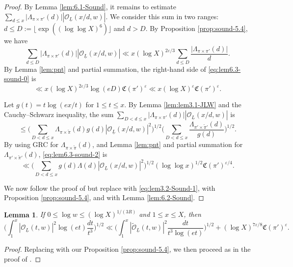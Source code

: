 \documentclass[12pt,reqno]{amsart}
\newtheorem{lem}[thm]{Lemma}
\theoremstyle{remark}
\numberwithin{equation}{section}
\begin{document}
	\begin{proof}
		By Lemma \ref{lem:6.1-Sound}, it remains to estimate $\sum_{d \le x}|\Lambda_{\pi \times \pi'}(d)||\mathcal{O}_{\underline{L}}(x/d,w)|$. We consider this sum in two ranges: $d \le D := \lfloor \exp((\log\log X)^6)\rfloor$ and $d > D$. By Proposition \ref{prop:sound-5.4}, we have
		\begin{equation}\label{eq:lem6.3-sound-0}
			\sum_{d \le D}|\Lambda_{\pi \times \pi'}(d)||\mathcal{O}_{\underline{L}}(x/d,w)| \ll x(\log X)^{2\varepsilon/3}\sum_{d \le D}\frac{|\Lambda_{\pi \times \pi'}(d)|}{d}.
		\end{equation}
		By Lemma \ref{lem:pnt} and partial summation, the right-hand side of \eqref{eq:lem6.3-sound-0} is	\begin{equation}\label{eq:lem6.3-sound-1}
                \ll x(\log X)^{2\varepsilon/3} \log(eD)\mathfrak{C}(\pi')^\varepsilon \ll x(\log X)^{\varepsilon} \mathfrak{C}(\pi')^\varepsilon .
	\end{equation}
 
     Let $g(t) = t \log(ex/t)$ for $1 \le t \le x$. By Lemma \ref{lem:lem3.1-JLW} and the Cauchy--Schwarz inequality, the sum $\sum_{D < d \le x}|\Lambda_{\pi \times \pi'}(d)||\mathcal{O}_{\underline{L}}(x/d,w)|$ is \begin{equation}
    \label{eq:lem6.3-sound-2}
        \le \Big(\sum_{D < d \le x}\Lambda_{\pi \times \widetilde{\pi}}(d)g(d)|\mathcal{O}_{\underline{L}}(x/d,w)|^2\Big)^{1/2} \Big(\sum_{D < d \le x}\frac{\Lambda_{\pi' \times \widetilde{\pi}'}(d)}{g(d)}\Big)^{1/2}.
     \end{equation}
        By using GRC for $\Lambda_{\pi \times \widetilde{\pi}}(d)$, and Lemma \ref{lem:pnt} and partial summation for $\Lambda_{\pi' \times \widetilde{\pi}'}(d)$,  \eqref{eq:lem6.3-sound-2} is 
	\begin{equation*}
            \ll  \Big(\sum_{D < d \le x}g(d)\Lambda(d)|\mathcal{O}_{\underline{L}}(x/d,w)|^2\Big)^{1/2}(\log\log x)^{1/2}\mathfrak{C}(\pi')^{{\varepsilon}/{4}}.
	\end{equation*}
 
		We now follow the proof of \cite[Proposition 6.3]{S} but replace \cite[Lemma 3.2]{S} with \eqref{eq:lem3.2-Sound-1}, \cite[Proposition 5.4]{S} with Proposition \ref{prop:sound-5.4}, and \cite[Lemma 6.2]{S} with Lemma \ref{lem:6.2-Sound}.
        \end{proof}

 
	\begin{lem}\label{lem:6.4-Sound}
		 If $0 \le \log w \le (\log X)^{1/(3R)}$ and $1 \le x \le X$, then 
		\begin{equation*}
			\Big(\int_1^x |\mathcal{O}_{\underline{L}}(t, w)|^2 \log(et) \frac{dt}{t^3}\Big)^{1/2} \ll \Big(\int_1^x|\widetilde{\mathcal{O}}_{\underline{L}}(t,w)|^{2} \frac{dt}{t^3\log(et)} \Big)^{1/2} + (\log X)^{{7\varepsilon}/{8}} \mathfrak{C}(\pi')^\varepsilon.
		\end{equation*}
	\end{lem}
	\begin{proof}  Replacing \cite[Proposition 5.4]{S} with our Proposition \ref{prop:sound-5.4}, we then proceed as in the proof of \cite[Lemma 6.4]{S}.
    \end{proof}
\end{document}

